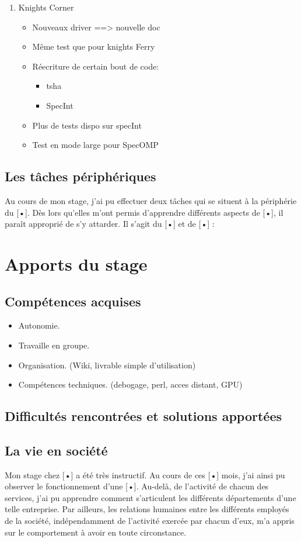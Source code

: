 \documentclass{article}
\begin{document}
\begin{enumerate}
			\item Knights Corner
				\begin{itemize}
				\item Nouveaux driver ==> nouvelle doc
				\item Même test que pour knights Ferry
				\item Réecriture de certain bout de code:
						\begin{itemize}
						\item tsha
						\item SpecInt
						\end{itemize}
				\item Plus de tests dispo sur specInt
				\item Test en mode large pour SpecOMP
				\end{itemize}
			\end{enumerate}
		\subsection{Les tâches périphériques}
			Au cours de mon stage, j’ai pu effectuer deux tâches qui se situent à la périphérie du [•]. Dès lors qu’elles 
			m’ont permis d’apprendre différents aspects de [•], il paraît approprié de s’y attarder. Il s’agit du [•] et 
			de [•] :
	\section{Apports du stage}
		\subsection{Compétences acquises}
			\begin{itemize}
			\item Autonomie.
			\item Travaille en groupe.
			\item Organisation. (Wiki, livrable simple d'utilisation)
			\item Compétences techniques. (debogage, perl, acces distant, GPU)
			\end{itemize}
		\subsection{Difficultés rencontrées et solutions apportées}
		\subsection{La vie en société}
			Mon stage chez [•] a été très instructif. Au cours de ces [•] mois, j’ai ainsi pu observer le fonctionnement 
			d’une [•]. Au-delà, de l’activité de chacun des services, j’ai pu apprendre comment s’articulent les différents 
			départements d’une telle entreprise. Par ailleurs, les relations humaines entre les différents employés de la 
			société, indépendamment de l’activité exercée par chacun d’eux, m’a appris sur le comportement à avoir en toute 
			circonstance.
\end{document}
